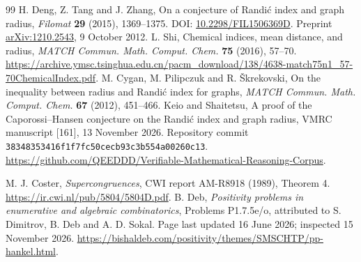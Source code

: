 \documentclass[11pt,a4paper]{article}
\theoremstyle{remark}\newtheorem{remark}[theorem]{Remark}
\numberwithin{equation}{section}
\begin{document}
\begin{thebibliography}{99}
H. Deng, Z. Tang and J. Zhang,
On a conjecture of Randi\'c index and graph radius,
\emph{Filomat} \textbf{29} (2015), 1369--1375.
DOI: \href{https://doi.org/10.2298/FIL1506369D}{10.2298/FIL1506369D}.
Preprint \href{https://arxiv.org/abs/1210.2543}{arXiv:1210.2543}, 9 October 2012.
L. Shi, Chemical indices, mean distance, and radius,
\emph{MATCH Commun. Math. Comput. Chem.} \textbf{75} (2016), 57--70.
\url{https://archive.ymsc.tsinghua.edu.cn/pacm_download/138/4638-match75n1_57-70ChemicalIndex.pdf}.
M. Cygan, M. Pilipczuk and R. \v{S}krekovski,
On the inequality between radius and Randi\'c index for graphs,
\emph{MATCH Commun. Math. Comput. Chem.} \textbf{67} (2012), 451--466.
Keio and Shaitetsu, A proof of the Caporossi--Hansen conjecture on the
Randi\'c index and graph radius, VMRC manuscript [161], 13 November 2026.
Repository commit \texttt{38348353416f1f7fc50cecb93c3b554a00260c13}.
\url{https://github.com/QEEDDD/Verifiable-Mathematical-Reasoning-Corpus}.

 M. J. Coster, \emph{Supercongruences}, CWI report
AM-R8918 (1989), Theorem 4. \url{https://ir.cwi.nl/pub/5804/5804D.pdf}.
 B. Deb, \emph{Positivity problems in enumerative and
algebraic combinatorics}, Problems P1.7.5e/o, attributed to S. Dimitrov,
B. Deb and A. D. Sokal. Page last updated 16 June 2026; inspected
15 November 2026.
\url{https://bishaldeb.com/positivity/themes/SMSCHTP/pp-hankel.html}.

\end{thebibliography}
\end{document}
